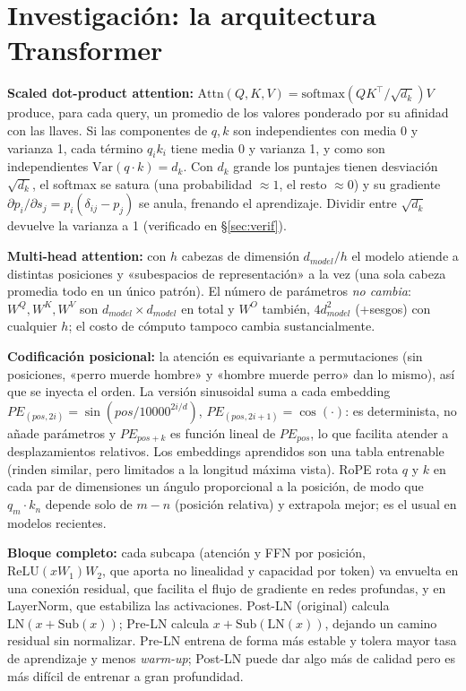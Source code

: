 \documentclass[10pt,letterpaper]{article}
\newcommand{\dk}{d_k}
\begin{document}
\section{Investigación: la arquitectura Transformer}
\textbf{Scaled dot-product attention:} $\mathrm{Attn}(Q,K,V)=\mathrm{softmax}(QK^\top/\sqrt{\dk})V$ produce, para cada query, un promedio de los valores ponderado por su afinidad con las llaves. Si las componentes de $q,k$ son independientes con media 0 y varianza 1, cada término $q_ik_i$ tiene media 0 y varianza 1, y como son independientes $\mathrm{Var}(q\cdot k)=\dk$. Con $\dk$ grande los puntajes tienen desviación $\sqrt{\dk}$, el softmax se satura (una probabilidad $\approx1$, el resto $\approx0$) y su gradiente $\partial p_i/\partial s_j=p_i(\delta_{ij}-p_j)$ se anula, frenando el aprendizaje. Dividir entre $\sqrt{\dk}$ devuelve la varianza a 1 (verificado en \S\ref{sec:verif}).

\textbf{Multi-head attention:} con $h$ cabezas de dimensión $d_{model}/h$ el modelo atiende a distintas posiciones y «subespacios de representación» a la vez (una sola cabeza promedia todo en un único patrón). El número de parámetros \emph{no cambia}: $W^Q,W^K,W^V$ son $d_{model}\times d_{model}$ en total y $W^O$ también, $4d_{model}^2$ (+sesgos) con cualquier $h$; el costo de cómputo tampoco cambia sustancialmente.

\textbf{Codificación posicional:} la atención es equivariante a permutaciones (sin posiciones, «perro muerde hombre» y «hombre muerde perro» dan lo mismo), así que se inyecta el orden. La versión sinusoidal suma a cada embedding $PE_{(pos,2i)}=\sin(pos/10000^{2i/d})$, $PE_{(pos,2i+1)}=\cos(\cdot)$: es determinista, no añade parámetros y $PE_{pos+k}$ es función lineal de $PE_{pos}$, lo que facilita atender a desplazamientos relativos. Los embeddings aprendidos son una tabla entrenable (rinden similar, pero limitados a la longitud máxima vista). RoPE rota $q$ y $k$ en cada par de dimensiones un ángulo proporcional a la posición, de modo que $q_m\!\cdot k_n$ depende solo de $m-n$ (posición relativa) y extrapola mejor; es el usual en modelos recientes.

\textbf{Bloque completo:} cada subcapa (atención y FFN por posición, $\mathrm{ReLU}(xW_1)W_2$, que aporta no linealidad y capacidad por token) va envuelta en una conexión residual, que facilita el flujo de gradiente en redes profundas, y en LayerNorm, que estabiliza las activaciones. Post-LN (original) calcula $\mathrm{LN}(x+\mathrm{Sub}(x))$; Pre-LN calcula $x+\mathrm{Sub}(\mathrm{LN}(x))$, dejando un camino residual sin normalizar. Pre-LN entrena de forma más estable y tolera mayor tasa de aprendizaje y menos \emph{warm-up}; Post-LN puede dar algo más de calidad pero es más difícil de entrenar a gran profundidad.
\end{document}
